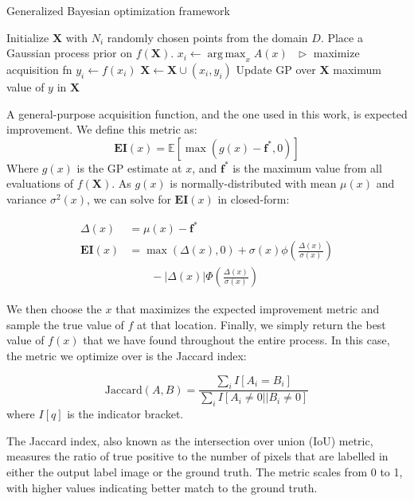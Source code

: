 \documentclass[10pt,twocolumn,letterpaper]{article}
\DeclareMathOperator*{\argmax}{arg\,max}
\begin{document}
\begin{algorithm}[h!]
\caption{Generalized Bayesian optimization framework}
\label{alg:bayesopt}
\begin{algorithmic}
\State Initialize $\mathbf{X}$ with $N_i$ randomly chosen points from the domain $D$.
\State Place a Gaussian process prior on $f(\mathbf{X})$.
    \State $x_i \gets \argmax_x A(x) \:\:\: \triangleright$ maximize acquisition fn
    \State $y_i \gets f(x_i)$
    \State $\mathbf{X} \gets \mathbf{X} \cup (x_i, y_i)$
    \State Update GP over $\mathbf{X}$
\EndFor
\State \Return maximum value of $y$ in $\mathbf{X}$
\end{algorithmic}
\end{algorithm}

A general-purpose acquisition function, and the one used in this work, is expected improvement. 
We define this metric as:
\begin{equation}
\mathbf{EI}(x) = \mathbb{E} \left[ \max(g(x) - \mathbf{f}^*, 0) \right]
\end{equation}
Where $g(x)$ is the GP estimate at $x$, and $\mathbf{f}^*$ is the maximum value from all evaluations of $f(\mathbf{X})$.
As $g(x)$ is normally-distributed with mean $\mu(x)$ and variance $\sigma^2(x)$, we can solve for $\mathbf{EI}(x)$ in closed-form:

\begin{equation}
\label{eqn:ei}
\begin{aligned}
\Delta(x) &= \mu(x) - \mathbf{f}^* \\
\mathbf{EI}(x) &= \max(\Delta(x), 0) + \sigma(x) \phi \left( \frac{\Delta(x)}{\sigma(x)} \right) \\ &\:\:\:\:\:\:\:\:\:- | \Delta(x) | \Phi \left( \frac{\Delta(x)}{\sigma(x)} \right)
\end{aligned}
\end{equation}

We then choose the $x$ that maximizes the expected improvement metric and sample the true value of $f$ at that location. Finally, we simply return the best value of $f(x)$ that we have found 
throughout the entire process. In this case, the metric we optimize over is the Jaccard index:

\begin{equation}
\label{eqn:jaccard}
\text{Jaccard}(A, B) = \frac{\sum_i I[A_i = B_i]}{\sum_i I[A_i \neq 0 || B_i \neq 0]}
\end{equation}
where $I[q]$ is the indicator bracket.

The Jaccard index, also known as the intersection over union (IoU) metric, measures the ratio of true positive to the number of pixels that are labelled in either the output label image or the 
ground truth. The metric scales from 0 to 1, with higher values indicating better match to the ground truth.
\end{document}
